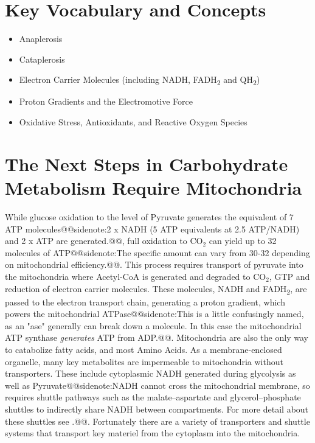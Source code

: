 \documentclass{tufte-handout}
\makeatletter
\def\sidenote#1{@@sidenote:#1@@}
\makeatother
\begin{document}
\section{Key Vocabulary and Concepts}
\begin{itemize}
	\item Anaplerosis
	\item Cataplerosis
	\item Electron Carrier Molecules (including NADH, FADH\textsubscript{2} and QH\textsubscript{2})
	\item Proton Gradients and the Electromotive Force
	\item Oxidative Stress, Antioxidants, and Reactive Oxygen Species
\end{itemize}

\section{The Next Steps in Carbohydrate Metabolism Require Mitochondria}
While glucose oxidation to the level of Pyruvate generates the equivalent of 7 ATP molecules\sidenote{2 x NADH (5 ATP equivalents at 2.5 ATP/NADH) and 2 x ATP are generated.}, full oxidation to CO$_2$ can yield up to 32 molecules of ATP\sidenote{The specific amount can vary from 30-32 depending on mitochondrial efficiency.}.  This process requires transport of pyruvate into the mitochondria where Acetyl-CoA is generated and degraded to CO$_2$, GTP and reduction of electron carrier molecules.  These molecules, NADH and FADH\textsubscript{2}, are passed to the electron transport chain, generating a proton gradient, which powers the mitochondrial ATPase\sidenote{This is a little confusingly named, as an "ase" generally can break down a molecule.  In this case the mitochondrial ATP synthase \emph{generates} ATP from ADP.}.  Mitochondria are also the only way to catabolize fatty acids, and most Amino Acids.  As a membrane-enclosed organelle, many key metabolites are impermeable to mitochondria without transporters.  These include cytoplasmic NADH generated during glycolysis as well as Pyruvate\sidenote{NADH cannot cross the mitochondrial membrane, so requires shuttle pathways such as the malate–aspartate and glycerol–phosphate shuttles to indirectly share NADH between compartments.  For more detail about these shuttles see \citet{mckennaNeuronalAstrocyticShuttle2006}.}.  Fortunately there are a variety of transporters and shuttle systems that transport key materiel from the cytoplasm into the mitochondria.
\end{document}
